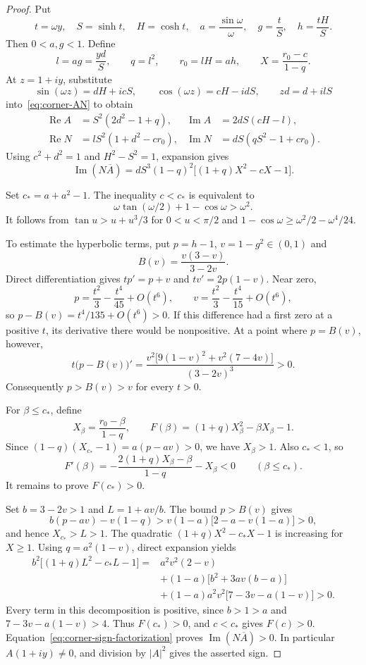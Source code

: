 \begin{proof}
Put
\[
t=\omega y,\quad S=\sinh t,\quad H=\cosh t,\quad
 a=\frac{\sin\omega}{\omega},\quad g=\frac tS,\quad h=\frac{tH}{S}.
\]
Then $0<a,g<1$. Define
\[
l=ag=\frac{yd}{S},\qquad q=l^2,\qquad r_0=lH=ah,
\qquad X=\frac{r_0-c}{1-q}.
\]
At $z=1+iy$, substitute
\[
\sin(\omega z)=dH+icS,\qquad
\cos(\omega z)=cH-idS,\qquad zd=d+ilS
\]
into~\eqref{eq:corner-AN} to obtain
\[
\begin{aligned}
\operatorname{Re}A&=S^2(2d^2-1+q),&
\operatorname{Im}A&=2dS(cH-l),\\
\operatorname{Re}N&=lS^2(1+d^2-cr_0),&
\operatorname{Im}N&=dS(qS^2-1+cr_0).
\end{aligned}
\]
Using $c^2+d^2=1$ and $H^2-S^2=1$, expansion gives
\begin{equation}\label{eq:corner-sign-factorization}
\operatorname{Im}(N\overline A)
=dS^3(1-q)^2\big[(1+q)X^2-cX-1\big].
\end{equation}

Set $c_*=a+a^2-1$. The inequality $c<c_*$ is equivalent to
\[
\omega\tan(\omega/2)+1-\cos\omega>\omega^2.
\]
It follows from $\tan u>u+u^3/3$ for $0<u<\pi/2$ and $1-\cos\omega\geq\omega^2/2-\omega^4/24$.

To estimate the hyperbolic terms, put $p=h-1$, $v=1-g^2\in(0,1)$ and
\[
B(v)=\frac{v(3-v)}{3-2v}.
\]
Direct differentiation gives $tp'=p+v$ and $tv'=2p(1-v)$. Near zero,
\[
p=\frac{t^2}{3}-\frac{t^4}{45}+O(t^6),\qquad
v=\frac{t^2}{3}-\frac{t^4}{15}+O(t^6),
\]
so $p-B(v)=t^4/135+O(t^6)>0$. If this difference had a first zero at a positive $t$, its derivative there would be nonpositive. At a point where $p=B(v)$, however,
\[
t\big(p-B(v)\big)'
=\frac{v^2\big[9(1-v)^2+v^2(7-4v)\big]}{(3-2v)^3}>0.
\]
Consequently $p>B(v)>v$ for every $t>0$.

For $\beta\leq c_*$, define
\[
X_\beta=\frac{r_0-\beta}{1-q},
\qquad F(\beta)=(1+q)X_\beta^2-\beta X_\beta-1.
\]
Since $(1-q)(X_{c_*}-1)=a(p-av)>0$, we have $X_\beta>1$. Also $c_*<1$, so
\[
F'(\beta)=-\frac{2(1+q)X_\beta-\beta}{1-q}-X_\beta<0
\qquad(\beta\leq c_*).
\]
It remains to prove $F(c_*)>0$.

Set $b=3-2v>1$ and $L=1+av/b$. The bound $p>B(v)$ gives
\[
b(p-av)-v(1-q)
>v(1-a)\big[2-a-v(1-a)\big]>0,
\]
and hence $X_{c_*}>L>1$. The quadratic $(1+q)X^2-c_*X-1$ is increasing for $X\geq1$. Using $q=a^2(1-v)$, direct expansion yields
\[
\begin{aligned}
b^2\big[(1+q)L^2-c_*L-1\big]
={}&a^2v^2(2-v)\\
&+(1-a)\big[b^2+3av(b-a)\big]\\
&+(1-a)a^2v^2\big[7-3v-a(1-v)\big]>0.
\end{aligned}
\]
Every term in this decomposition is positive, since $b>1>a$ and $7-3v-a(1-v)>4$. Thus $F(c_*)>0$, and $c<c_*$ gives $F(c)>0$. Equation~\eqref{eq:corner-sign-factorization} proves $\operatorname{Im}(N\overline A)>0$. In particular $A(1+iy)\neq0$, and division by $|A|^2$ gives the asserted sign.
\end{proof}

